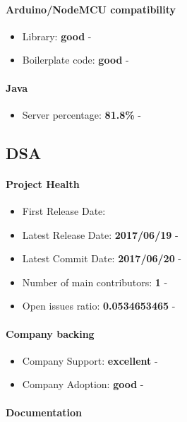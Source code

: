 \documentclass{article}
\begin{document}
\paragraph{Arduino/NodeMCU compatibility}

\begin{itemize}
\item Library: \textbf{good} - 
\item Boilerplate code: \textbf{good} - 
\end{itemize}

\paragraph{Java} 

\begin{itemize}
\item Server percentage: \textbf{81.8\%} - 
\end{itemize}

\subsection{DSA}

\paragraph{Project Health}

\begin{itemize}
\item First Release Date: 
\item Latest Release Date: \textbf{2017/06/19} - 
\item Latest Commit Date: \textbf{2017/06/20} - 
\item Number of main contributors: \textbf{1} - 
\item Open issues ratio: \textbf{0.0534653465} - 
\end{itemize}

\paragraph{Company backing}

\begin{itemize}
\item Company Support: \textbf{excellent} - 
\item Company Adoption: \textbf{good} - 
\end{itemize}

\paragraph{Documentation}
\end{document}
